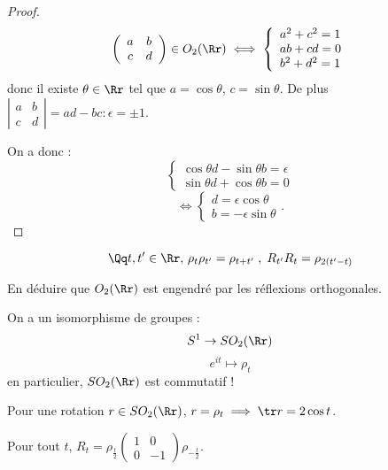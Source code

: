 \documentclass[class=report,crop=false]{standalone}
\begin{document}
\begin{proof}
\[\left(\begin{array}{cc}
a & b\\
c & d
\end{array}\right) \in O_2(\Rr) \iff \left\{\begin{array}{l}
a^2+c^2 =1\\
ab+cd = 0\\
b^2 +d^2 =1
\end{array}\right.\]
donc il existe $\theta \in \Rr$ tel que $a = \cos \theta$, $c= \sin \theta$. De plus $\left|\begin{array}{cc}
a & b\\
c & d
\end{array}\right| = ad-bc :\epsilon = \pm1$.

On a donc :
\[\left\{\begin{array}{l}
\cos \theta d - \sin \theta b = \epsilon\\
\sin \theta d + \cos \theta b = 0
\end{array}\right.\]
\[\iff \left\{\begin{array}{l}
d = \epsilon \cos \theta\\
b = -\epsilon \sin \theta
\end{array}\right..\]
\end{proof}

\begin{exercicecours}\label{exo:symrot}
\[\Qq t,t'\in \Rr,\, \rho_t\rho_{t'} = \rho_{t+t'} \;,\; R_{t'}R_{t}=\rho_{2(t'-t)}\]
\end{exercicecours}

\begin{exercicecours}
En déduire que $O_2(\Rr)$ est engendré par les réflexions orthogonales.
\end{exercicecours}

\begin{exercicecours}
On a un isomorphisme de groupes : 
\[S^1 \to SO_2(\Rr)\]
\[e^{it } \mapsto \rho_t\]
en particulier, $SO_2(\Rr)$ est commutatif !
\end{exercicecours}



\begin{remarque*}
Pour une rotation $r \in SO_2(\Rr)$, $r =\rho_t \implies \tr r = 2 \cos t$.
\end{remarque*}

\begin{exercicecours}
Pour tout $t$, $R_t = \rho_{\frac{t}{2}} \left(\begin{array}{cc}
1 & 0\\
0& -1
\end{array}\right) \rho_{-\frac{t}{2}}$. 
\end{exercicecours}
\end{document}
